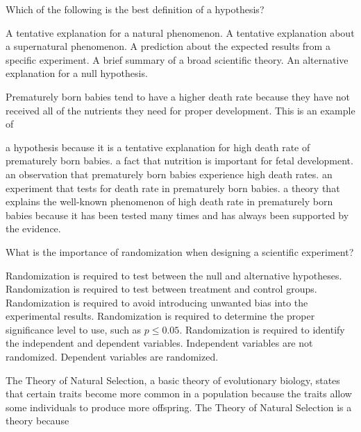\question
Which of the following is the best definition of a hypothesis?

\begin{choices}
\correctchoice A tentative explanation for a natural phenomenon.
\choice A tentative explanation about a supernatural phenomenon.
\choice A prediction about the expected results from a specific experiment.
\choice A brief summary of a broad scientific theory.
\choice An alternative explanation for a null hypothesis.
\end{choices}

\question
Prematurely born babies tend to have a higher death rate because they have not received all of the nutrients they need for proper development. This is an example of

\begin{choices}
\correctchoice a hypothesis because it is a tentative explanation for high death rate of prematurely born babies.
\choice a fact that nutrition is important for fetal development.
\choice an observation that prematurely born babies experience high death rates.
\choice an experiment that tests for death rate in prematurely born babies.
\choice a theory that explains the well-known phenomenon of high death rate in prematurely born babies because it has been tested many times and has always been supported by the evidence.
\end{choices}

\question
What is the importance of randomization when designing a scientific experiment?

\begin{choices}
\choice Randomization is required to test between the null and alternative hypotheses.
\choice Randomization is required to test between treatment and control groups.
\correctchoice Randomization is required to avoid introducing unwanted bias into the experimental results.
\choice Randomization is required to determine the proper significance level to use, such as $p \le 0.05$.
\choice Randomization is required to identify the independent and dependent variables. Independent variables are not randomized. Dependent variables are randomized.
\end{choices}

\question
The Theory of Natural Selection, a basic theory of evolutionary biology, states that certain traits become more common in a population because the traits allow some individuals to produce more offspring. The Theory of Natural Selection is a theory because

